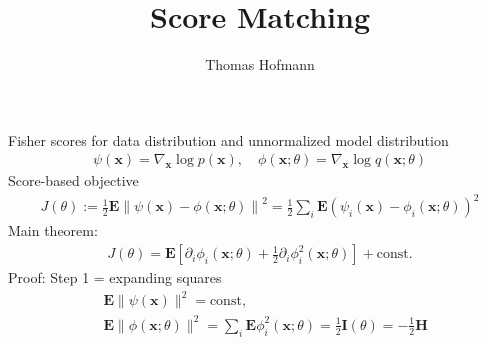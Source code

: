 \documentclass{article}
\title{Score Matching}
\author{Thomas Hofmann}
\newcommand{\E}{{\mathbf E}}
\newcommand{\x}{{\mathbf x}}
\begin{document}
\maketitle

Fisher scores for data distribution and unnormalized model distribution 
\begin{align}
\psi(\x) = \nabla_\x \log p(\x), \quad 
\phi(\x; \theta) = \nabla_\x \log q(\x; \theta)
\end{align}
Score-based objective
\begin{align}
J(\theta) 
:= \frac 12 \E \left\| \psi(\x) -\phi(\x; \theta) \right\|^2 
= \frac 12 \sum_i \E  \left( \psi_i(\x) -\phi_i(\x; \theta) \right)^2 
\end{align}
Main theorem:
\begin{align}
J(\theta) = \E \left[ \partial_i \phi_i(\x;\theta) + \frac12 \partial_i \phi_i^2(\x;\theta) \right] + \text{const.}
\end{align}
Proof: Step 1 = expanding squares 
\begin{align}
&  \E \| \psi(\x)\|^2 = \text{const}, \\
& \E \| \phi(\x; \theta) \|^2 
= \sum_i \E \phi_i^2(\x; \theta)
= \frac 12 \mathbf I(\theta) = - \frac 12 \mathbf H
\end{align}


\end{document}
